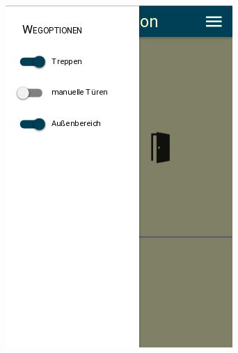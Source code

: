 \begin{figure}[ht]
\begin{minipage}[b]{.5\textwidth}
  \includegraphics[width=.8\linewidth]{img/wegoptionen.png}
  \label{img:wegoptionen-first-draft}
\end{minipage}
\end{figure}